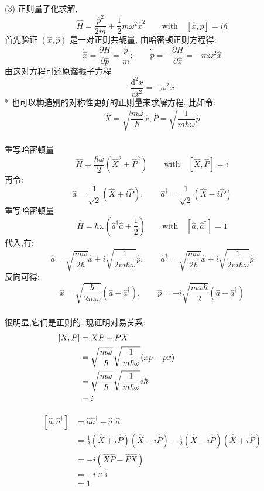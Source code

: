 \begin{frame}
    \frametitle{}
    \解 (3) 正则量子化求解, 
  \begin{equation*}
      \hat{H} = \frac{\hat{p}^2 }{2m} + \dfrac{1}{2} m \omega ^2 \hat{x}^2   \qquad \text{with} \quad [\hat{x},\hat{p}]=i\hbar 
  \end{equation*}	
  首先验证 $(\hat{x},\hat{p})$ 是一对正则共轭量, 由哈密顿正则方程得: \\ 
  \[ \dot{\hat{x}} = \frac{\partial H }{\partial \hat{p} } =  \frac{{\hat{p}}}{m}; \qquad   \dot{\hat{p}} = - \frac{\partial H }{\partial \hat{x} } = -m \omega ^2 \hat{x} \]
  由这对方程可还原谐振子方程
  \[\frac{\mathrm{d}^2 x}{\mathrm{d} t ^2}  = - \omega^2 x\]
  * 也可以构造别的对称性更好的正则量来求解方程. 比如令: 
  \[ \hat{X} = \sqrt{\frac{m\omega}{\hbar}}\hat{x}, \hat{P} = \sqrt{\frac{1}{m \hbar \omega}} \hat{p} \]
\end{frame}

\begin{frame}
    \frametitle{}
  重写哈密顿量
    \[  \hat{H}= \frac{\hbar \omega }{2} (\hat{X}^2 + \hat{P}^2 ) \qquad \text{with} \quad [\hat{X},\hat{P}]=i \]
  再令:
  \[ \hat{a}= \frac{1 }{\sqrt{2}} (\hat{X} + i\hat{P} ), \qquad \hat{a}^\dagger= \frac{1 }{\sqrt{2}} (\hat{X} - i\hat{P} ) \]
  重写哈密顿量
  \[  \hat{H}= \hbar \omega \left(\hat{a}^\dagger \hat{a} + \frac{1 }{2}\right) \qquad \text{with} \quad [\hat{a},\hat{a}^\dagger]=1 \]
  代入,有:
  \[ \hat{a}= \sqrt{\frac{m\omega}{2\hbar}}\hat{x} + i \sqrt{\frac{1}{2 m \hbar \omega}} \hat{p}, \qquad 
  \hat{a}^\dagger= \sqrt{\frac{m\omega}{2\hbar}}\hat{x} + i \sqrt{\frac{1}{2 m \hbar \omega}} \hat{p}\]
  反向可得:
  \[ \hat{x}= \sqrt{\frac{\hbar}{2m\omega}} (\hat{a}+ \hat{a}^\dagger), \qquad 
  \hat{p}= -i \sqrt{\frac{m \omega \hbar}{2}} (\hat{a}-\hat{a}^\dagger)\]
\end{frame}

\begin{frame}
    \frametitle{}
    很明显,它们是正则的. 现证明对易关系: 
  \[ \begin{aligned}
      [X,P] &=   XP- PX \\ 
      &=  \sqrt{\frac{m\omega}{\hbar}} \sqrt{\frac{1}{m \hbar \omega}}   (xp-px)  {\hspace*{8em}}~~\\
      &=  \sqrt{\frac{m\omega}{\hbar}} \sqrt{\frac{1}{m \hbar \omega}} i \hbar  \\
      &= i
  \end{aligned}\]
   
  \[ \begin{aligned}
       [\hat{a},\hat{a}^\dagger] &=   \hat{a}\hat{a}^\dagger - \hat{a}^\dagger\hat{a} \\ 
       &= \frac{1}{2} (\hat{X} + i\hat{P} )  (\hat{X} - i\hat{P} )  - \frac{1}{2} (\hat{X} - i\hat{P} ) (\hat{X} + i\hat{P} )  \\
       &=  -i (\hat{X}\hat{P}-\hat{P}\hat{X}) \\
       &= -i \times i \\
       &= 1
   \end{aligned}\]
\end{frame}


